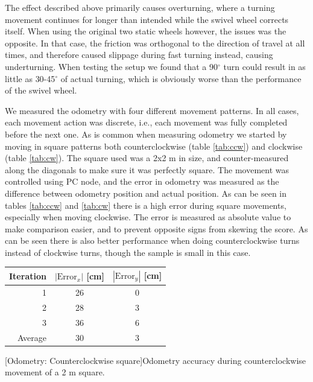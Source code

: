 \documentclass[11pt]{article}
\begin{document}
The effect described above primarily causes overturning, where a turning
movement continues for longer than intended while the swivel wheel corrects
itself. When using the original two static wheels however, the issues was the
opposite. In that case, the friction was orthogonal to the direction of travel
at all times, and therefore caused slippage during fast turning instead, causing
underturning. When testing the setup we found that a 90$^\circ$ turn could
result in as little as {30-45}$^\circ$ of actual turning, which is obviously
worse than the performance of the swivel wheel. \par

We measured the odometry with four different movement patterns. In all cases,
each movement action was discrete, i.e., each movement was fully completed
before the next one. As is common when measuring odometry we started by moving
in square patterns both counterclockwise (table \vref{tab:ccw}) and clockwise
(table \vref{tab:cw}). The square used was a 2x2 m in size, and counter-measured
along the diagonals to make sure it was perfectly square. The movement was
controlled using PC node, and the error in odometry was measured as the
difference between odometry position and actual position. As can be seen in
tables \ref{tab:ccw} and \ref{tab:cw} there is a high error during square
movements, especially when moving clockwise. The error is measured as absolute
value to make comparison easier, and to prevent opposite signs from skewing the
score. As can be seen there is also better performance when doing
counterclockwise turns instead of clockwise turns, though the sample is small in
this case. \par

\begin{center}
  \begin{tabular}{r|cc}
    Iteration & $|\text{Error}_x|$ [cm] & $|\text{Error}_y|$ [cm] \\ \hline
    1 & 26 & 0 \\
    2 & 28 & 3 \\
    3 & 36 & 6 \\ \hline
    Average & 30 & 3             
  \end{tabular}
  [Odometry: Counterclockwise square]{Odometry accuracy during
    counterclockwise movement of a 2 m square.\label{tab:ccw}}
\end{center}\par
\end{document}
